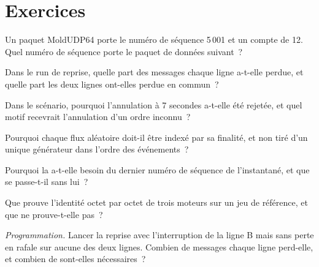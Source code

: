 \section{Exercices}

\begin{exercise}[$\star$]\label{exo:mx:build-a-matching-engine-and-exchange-simulator:1}
Un paquet MoldUDP64 porte le numéro de séquence 5\,001 et un compte de 12. Quel numéro de séquence porte le paquet de données suivant~?
\end{exercise}

\begin{exercise}[$\star$]\label{exo:mx:build-a-matching-engine-and-exchange-simulator:2}
Dans le run de reprise, quelle part des messages chaque ligne a-t-elle perdue, et quelle part les deux lignes ont-elles perdue en commun~?
\end{exercise}

\begin{exercise}[$\star$]\label{exo:mx:build-a-matching-engine-and-exchange-simulator:3}
Dans le scénario, pourquoi l'annulation à 7 secondes a-t-elle été rejetée, et quel motif recevrait l'annulation d'un ordre inconnu~?
\end{exercise}

\begin{exercise}[$\star\star$]\label{exo:mx:build-a-matching-engine-and-exchange-simulator:4}
Pourquoi chaque flux aléatoire doit-il être indexé par sa finalité, et non tiré d'un unique générateur dans l'ordre des événements~?
\end{exercise}

\begin{exercise}[$\star\star$]\label{exo:mx:build-a-matching-engine-and-exchange-simulator:5}
Pourquoi la  a-t-elle besoin du dernier numéro de séquence de l'instantané, et que se passe-t-il sans lui~?
\end{exercise}

\begin{exercise}[$\star\star$]\label{exo:mx:build-a-matching-engine-and-exchange-simulator:6}
Que prouve l'identité octet par octet de trois moteurs sur un jeu de référence, et que ne prouve-t-elle pas~?
\end{exercise}

\begin{exercise}[$\star\star\star$]\label{exo:mx:build-a-matching-engine-and-exchange-simulator:7}
\emph{Programmation.} Lancer la reprise avec l'interruption de la ligne B mais sans perte en rafale sur aucune des deux lignes. Combien de messages chaque ligne perd-elle, et combien de
 sont-elles nécessaires~?
\end{exercise}

